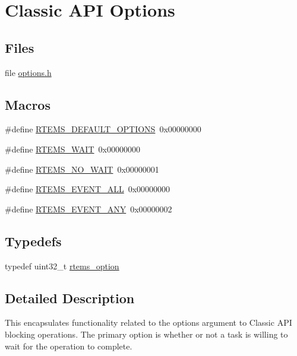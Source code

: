 \hypertarget{group__ClassicOptions}{}\section{Classic A\+PI Options}
\label{group__ClassicOptions}
\subsection*{Files}
\begin{DoxyCompactItemize}
\item 
file \mbox{\hyperlink{options_8h}{options.\+h}}
\end{DoxyCompactItemize}
\subsection*{Macros}
\begin{DoxyCompactItemize}
\item 
\#define \mbox{\hyperlink{group__ClassicOptions_ga9d84c5564cb9e83de29ebf8da2b123ca}{R\+T\+E\+M\+S\+\_\+\+D\+E\+F\+A\+U\+L\+T\+\_\+\+O\+P\+T\+I\+O\+NS}}~0x00000000
\item 
\#define \mbox{\hyperlink{group__ClassicOptions_ga6c344518194b529f32555ad5a9f85613}{R\+T\+E\+M\+S\+\_\+\+W\+A\+IT}}~0x00000000
\item 
\#define \mbox{\hyperlink{group__ClassicOptions_gad525b4743e16aabd538fb492b71ba21d}{R\+T\+E\+M\+S\+\_\+\+N\+O\+\_\+\+W\+A\+IT}}~0x00000001
\item 
\#define \mbox{\hyperlink{group__ClassicOptions_gafe88e8efae3e200e7fec8bd894dc09ec}{R\+T\+E\+M\+S\+\_\+\+E\+V\+E\+N\+T\+\_\+\+A\+LL}}~0x00000000
\item 
\#define \mbox{\hyperlink{group__ClassicOptions_ga164c17066d5d7f90e8626bfc0f6b6249}{R\+T\+E\+M\+S\+\_\+\+E\+V\+E\+N\+T\+\_\+\+A\+NY}}~0x00000002
\end{DoxyCompactItemize}
\subsection*{Typedefs}
\begin{DoxyCompactItemize}
\item 
typedef uint32\+\_\+t \mbox{\hyperlink{group__ClassicOptions_gad26685eb0e60a9650082935c31920e29}{rtems\+\_\+option}}
\end{DoxyCompactItemize}


\subsection{Detailed Description}
This encapsulates functionality related to the options argument to Classic A\+PI blocking operations. The primary option is whether or not a task is willing to wait for the operation to complete. 

